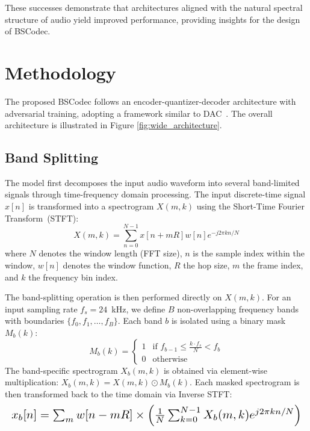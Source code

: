 \documentclass[11pt]{article}
\begin{document}
These successes demonstrate that architectures aligned with the natural spectral structure of audio yield improved performance, providing insights for the design of BSCodec. 

\section{Methodology}
\label{sec:met}
The proposed BSCodec follows an encoder-quantizer-decoder architecture with adversarial training, adopting a framework similar to DAC~\cite{kumar2023high}. The overall architecture is illustrated in Figure \ref{fig:wide_architecture}.

\subsection{Band Splitting}


The model first decomposes the input audio waveform into several band-limited signals through time-frequency domain processing. The input discrete-time signal $x[n]$ is transformed into a spectrogram $X(m, k)$ using the Short-Time Fourier Transform~(STFT):
\begin{equation}
X(m, k) = \sum_{n=0}^{N-1} x[n+mR] w[n] e^{-j2\pi kn/N}
\end{equation}
where $N$ denotes the window length (FFT size), $n$ is the sample index within the window, $w[n]$ denotes the window function, $R$ the hop size, $m$ the frame index, and $k$ the frequency bin index.

The band-splitting operation is then performed directly on $X(m, k)$. For an input sampling rate $f_s = 24$~kHz, we define $B$ non-overlapping frequency bands with boundaries $\{f_0, f_1, \dots, f_B\}$. Each band $b$ is isolated using a binary mask $M_b(k)$:
\begin{equation}
M_b(k) = \begin{cases} 1 & \text{if } f_{b-1} \le \frac{k \cdot f_s}{N} < f_b \\ 0 & \text{otherwise} \end{cases}
\end{equation}
The band-specific spectrogram $X_b(m, k)$ is obtained via element-wise multiplication: $X_b(m, k) = X(m, k) \odot M_b(k)$. Each masked spectrogram is then transformed back to the time domain via Inverse STFT:
\begin{equation}
\resizebox{\linewidth}{!}{$
x_b[n] = \sum_{m} w[n - mR]\times\left(\frac{1}{N} 
\sum_{k=0}^{N-1} X_b(m, k) e^{j 2\pi k n / N}\right)
$}
\end{equation}
\end{document}
